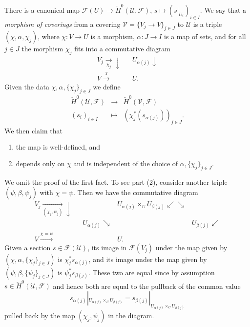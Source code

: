 There is a canonical map
$\mathcal{F}(U) \to \check H^0 (\mathcal{U}, \mathcal{F})$,
$s \mapsto (s |_{U_i})_{i\in I}$.
We say that a {\it morphism of coverings} from a covering
$\mathcal{V} = \{V_j \to V\}_{j \in J}$ to $\mathcal{U}$ is a triple
$(\chi, \alpha, \chi_j)$, where
$\chi : V \to U$ is a morphism,
$\alpha : J \to I$ is a map of sets, and for all
$j \in J$ the morphism $\chi_j$ fits into a commutative diagram
$$
\begin{array}{ccc}V_j \underset{\chi_j}{\longrightarrow}\downarrow &  & U_{\alpha(j)} \downarrow \\ V \overset{\chi}{\longrightarrow} &  & U.\end{array}
$$
Given the data $\chi, \alpha, \{\chi_j\}_{j \in J}$ we define
\begin{eqnarray*}
\check H^0(\mathcal{U}, \mathcal{F}) & \longrightarrow &
\check H^0(\mathcal{V}, \mathcal{F}) \\
(s_i)_{i\in I} & \longmapsto &
\left(\chi_j^*\left(s_{\alpha(j)}\right)\right)_{j\in J}.
\end{eqnarray*}
We then claim that
\begin{enumerate}
\item the map is well-defined, and
\item depends only on $\chi$ and is independent of the choice of
$\alpha, \{\chi_j\}_{j \in J}$.
\end{enumerate}
We omit the proof of the first fact.
To see part (2), consider another triple $(\psi, \beta, \psi_j)$ with
$\chi = \psi$. Then we have the commutative diagram
$$
\begin{array}{ccccc}V_j \underset{(\chi_j, \psi_j)}{\longrightarrow}\downarrow &  &  & U_{\alpha(j)} \times_U U_{\beta(j)} \swarrow\searrow &  \\  &  & U_{\alpha(j)} \searrow &  & U_{\beta(j)} \swarrow \\ V \overset{\chi = \psi}{\longrightarrow} &  &  & U. & \end{array}
$$
Given a section $s \in \mathcal{F}(\mathcal{U})$, its image in
$\mathcal{F}(V_j)$ under the map given by
$(\chi, \alpha, \{\chi_j\}_{j \in J})$
is $\chi_j^*s_{\alpha(j)}$, and
its image under the map given by $(\psi, \beta, \{\psi_j\}_{j \in J})$
is $\psi_j^*s_{\beta(j)}$. These
two are equal since by assumption $s \in \check H^0(\mathcal{U}, \mathcal{F})$
and hence both are equal to the pullback of the common value
$$
s_{\alpha(j)}|_{U_{\alpha(j)} \times_U U_{\beta(j)}} =
s_{\beta(j)}|_{U_{\alpha(j)} \times_U U_{\beta(j)}}
$$
pulled back by the map $(\chi_j, \psi_j)$ in the diagram.

